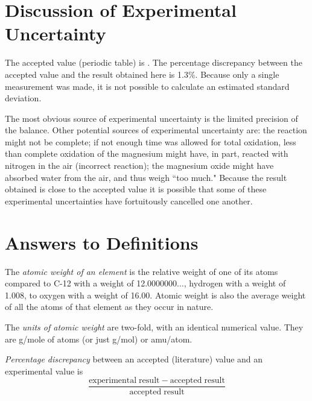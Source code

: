 \documentclass{article}
\begin{document}
\section{Discussion of Experimental Uncertainty}

The accepted value (periodic table) is  \cite{Smith:2012qr}. The percentage discrepancy between the accepted value and the result obtained here is 1.3\%. Because only a single measurement was made, it is not possible to calculate an estimated standard deviation.

The most obvious source of experimental uncertainty is the limited precision of the balance. Other potential sources of experimental uncertainty are: the reaction might not be complete; if not enough time was allowed for total oxidation, less than complete oxidation of the magnesium might have, in part, reacted with nitrogen in the air (incorrect reaction); the magnesium oxide might have absorbed water from the air, and thus weigh ``too much." Because the result obtained is close to the accepted value it is possible that some of these experimental uncertainties have fortuitously cancelled one another.


\section{Answers to Definitions}

\begin{enumerate}
\begin{item}
The \emph{atomic weight of an element} is the relative weight of one of its atoms compared to C-12 with a weight of 12.0000000$\ldots$, hydrogen with a weight of 1.008, to oxygen with a weight of 16.00. Atomic weight is also the average weight of all the atoms of that element as they occur in nature.
\end{item}
\begin{item}
The \emph{units of atomic weight} are two-fold, with an identical numerical value. They are g/mole of atoms (or just g/mol) or amu/atom.
\end{item}
\begin{item}
\emph{Percentage discrepancy} between an accepted (literature) value and an experimental value is
\begin{equation*}
\frac{\mathrm{experimental\;result} - \mathrm{accepted\;result}}{\mathrm{accepted\;result}}
\end{equation*}
\end{item}
\end{enumerate}






\end{document}
